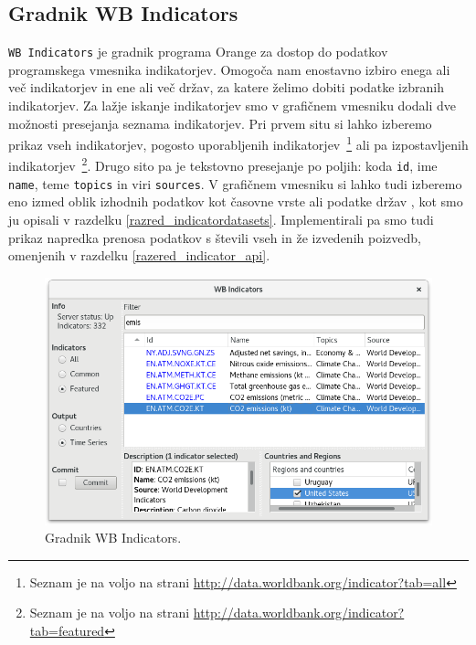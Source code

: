 \subsection{Gradnik WB Indicators}

\verb|WB Indicators| je gradnik programa Orange za dostop do podatkov
programskega vmesnika indikatorjev. Omogoča nam enostavno izbiro
enega ali več indikatorjev in ene ali več držav, za katere želimo dobiti
podatke izbranih indikatorjev. Za lažje iskanje indikatorjev smo v grafičnem
vmesniku dodali dve možnosti presejanja seznama indikatorjev. Pri prvem situ
si lahko izberemo prikaz vseh indikatorjev, pogosto uporabljenih 
indikatorjev~\footnote{Seznam je na voljo na strani 
\url{http://data.worldbank.org/indicator?tab=all}}
ali pa izpostavljenih indikatorjev~\footnote{Seznam je na voljo na strani 
\url{http://data.worldbank.org/indicator?tab=featured}}. Drugo sito pa je
tekstovno presejanje po poljih: koda {\tt id}, ime {\tt name}, teme {\tt topics} in
viri {\tt sources}. 
V grafičnem vmesniku si lahko tudi izberemo eno izmed oblik izhodnih podatkov
kot časovne vrste  ali podatke držav , 
kot smo ju opisali v razdelku \ref{razred_indicatordatasets}. 
Implementirali pa smo tudi prikaz napredka prenosa podatkov s števili vseh in
že izvedenih poizvedb, omenjenih v razdelku \ref{razered_indicator_api}.


\begin{figure}
\begin{center}
\includegraphics[width=13.75cm]{pic/co2_temp_indicator_selection.png}
\end{center}
\caption{Gradnik WB Indicators.}
\label{co2_temp_indicator}
\end{figure} 




